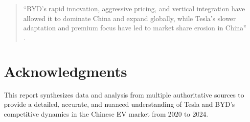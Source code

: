 \documentclass{article}
\begin{document}
\begin{quote}
``BYD's rapid innovation, aggressive pricing, and vertical integration have allowed it to dominate China and expand globally, while Tesla's slower adaptation and premium focus have led to market share erosion in China'' \citep{restofworld2025}.
\end{quote}

\section*{Acknowledgments}
This report synthesizes data and analysis from multiple authoritative sources to provide a detailed, accurate, and nuanced understanding of Tesla and BYD's competitive dynamics in the Chinese EV market from 2020 to 2024.



\end{document}
